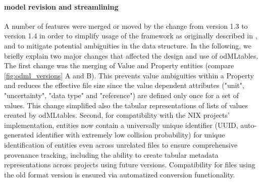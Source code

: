 \paragraph{ model revision and streamlining}
\label{sec:odml_model_revision}
A number of features were merged or moved by the change from  version 1.3 to version 1.4 in order to simplify usage of the  framework as originally described in \citet{Grewe_2011}, and to mitigate potential ambiguities in the data structure. In the following, we briefly explain two major changes that affected the design and use of odMLtables. The first change was the merging of Value and Property entities (compare \cref{fig:odml_versions} A and B). This prevents value ambiguities within a Property and reduces the effective file size since the value dependent attributes ("unit", "uncertainty", "data type" and "reference") are defined only once for a set of values. This change simplified also the tabular representations of lists of values created by odMLtables. Second, for compatibility with the NIX projects'  implementation, entities now contain a universally unique identifier (UUID, auto-generated identifier with extremely low collision probability) for unique identification of  entities even across unrelated files to ensure comprehensive provenance tracking, including the ability to create tabular metadata representations across projects using future  versions. Compatibility for  files using the old format version is ensured via automatized conversion functionality.


